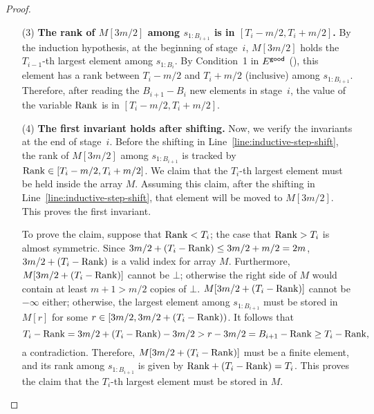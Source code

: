 \begin{proof}
\begin{enumerate}
    If the right side of $M$ did not contain $-\infty$ at the beginning, by the inductive hypothesis, it might have contained $\le m/2$ copies of ``$\bot$''. Then, $M[3m/2], M[3m/2+1], \ldots, M[5m/2]$ must be consecutive entries among $s_{1:B_i}$, with the $T_{i-1}$-th largest element at index $3m/2$. It follows that $T_{i-1} + m \le B_i$. By Condition~3 of $\goodevent$ (),  there are at least $m/2$ elements in $s_{B_i+1:B_{i+1}}$ that are between the $T_{i-1}$-th and the $(T_{i-1}+m)$-th largest elements among $s_{1:B_i}$. It follows that, after reading $s_{B_i+1}$ through $s_{B_{i+1}}$, the right side of $M$ is filled with finite elements. 
    \item[(3)] \textbf{The rank of $M[3m/2]$ among $s_{1:B_{i+1}}$ is in $[T_i - m/2, T_i + m/2]$.} By the induction hypothesis, at the beginning of stage~$i$, $M[3m/2]$ holds the $T_{i-1}$-th largest element among $s_{1:B_i}$. By Condition~1 in $\goodevent$ (), this element has a rank between $T_i - m/2$ and  $T_i + m/2$ (inclusive) among $s_{1:B_{i+1}}$. Therefore, after reading the $B_{i+1} - B_i$ new elements in stage~$i$, the value of the variable $\mathrm{Rank}$ is in $[T_i - m/2, T_i + m/2]$. 
    \item[(4)] \textbf{The first invariant holds after shifting.} Now, we verify the invariants at the end of stage~$i$. Before the shifting in Line~\ref{line:inductive-step-shift}, the rank of $M[3m/2]$ among $s_{1:B_{i+1}}$ is tracked by $\mathrm{Rank} \in [T_i - m/2, T_i + m/2]$. We claim that the $T_i$-th largest element must be held inside the array $M$. Assuming this claim, after the shifting in Line~\ref{line:inductive-step-shift}, that element will be moved to $M[3m/2]$. This proves the first invariant.
    
    To prove the claim, suppose that $\mathrm{Rank} < T_i$; the case that $\mathrm{Rank} > T_i$ is almost symmetric. Since $3m/2 + (T_i - \mathrm{Rank}) \le 3m/2 + m/2 = 2m$, $3m/2 + (T_i - \mathrm{Rank})$ is a valid index for array $M$. Furthermore, $M[3m/2 + (T_i - \mathrm{Rank})]$ cannot be $\bot$; otherwise the right side of $M$ would contain at least $m + 1 > m/2$ copies of $\bot$. $M[3m/2 + (T_i - \mathrm{Rank})]$ cannot be $-\infty$ either; otherwise, the largest element among $s_{1:B_{i+1}}$ must be stored in $M[r]$ for some $r \in [3m/2, 3m/2 + (T_i - \mathrm{Rank}))$. It follows that
    \[
        T_i - \mathrm{Rank}
    =   3m/2 + (T_i - \mathrm{Rank}) - 3m/2
    >   r - 3m/2
    =   B_{i+1} - \mathrm{Rank}
    \ge T_i - \mathrm{Rank},
    \]
    a contradiction. Therefore, $M[3m/2 + (T_i - \mathrm{Rank})]$ must be a finite element, and its rank among $s_{1:B_{i+1}}$ is given by $\mathrm{Rank} + (T_i - \mathrm{Rank}) = T_i$. This proves the claim that the $T_i$-th largest element must be stored in $M$.


\end{enumerate}
\end{proof}
